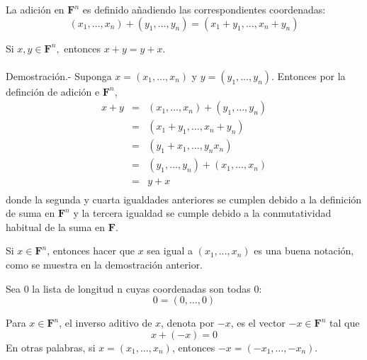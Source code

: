 \setcounter{mydef}{11}
    \begin{mydef}
	La adición en $\textbf{F}^n$ es definido añadiendo las correspondientes coordenadas: 
	$$(x_1,\ldots,x_n)+(y_1,\ldots, y_n)=(x_1+y_1,\ldots, x_n + y_n)$$
    \end{mydef}

\begin{myteo}
    Si $x,y \in \textbf{F}^n,$ entonces $x+y=y+x$.\\\\
    Demostración.-\; Suponga $x=(x_1,\ldots, x_n)$ y $y=(y_1,\ldots, y_n)$. Entonces por la definción de adición e $\textbf{F}^n$,
    $$\begin{array}{rcl}
	x+y&=&(x_1,\ldots,x_n)+(y_1,\ldots,y_n)\\
	   &=&(x_1+y_1,\ldots, x_n + y_n)\\
	   &=&(y_1+x_1,\ldots, y_n x_n)\\
	   &=&(y_1,\ldots,y_n)+(x_1,\ldots,x_n)\\
	   &=&y+x\\
    \end{array}$$
    donde la segunda y cuarta igualdades anteriores se cumplen debido a la definición de suma en $\textbf{F}^n$ y la tercera igualdad se cumple debido a la conmutatividad habitual de la suma en $\textbf{F}$.
\end{myteo}
\vspace{0.3cm}

    Si $x \in \textbf{F}^n$, entonces hacer que $x$ sea igual a $(x_1,\ldots,x_n)$ es una buena notación, como se muestra en la demostración anterior.

    \begin{mydef}[$0$]
	Sea $0$ la lista de longitud n cuyas coordenadas son todas 0: 
	$$0=(0,\ldots,0)$$
    \end{mydef}

\setcounter{mydef}{15}
    \begin{mydef}
	Para $x\in \textbf{F}^n$, el inverso aditivo de $x$, denota por $-x$, es el vector $-x\in \textbf{F}^n$ tal que $$x+(-x) =0$$
	En otras palabras, si $x=(x_1,\ldots,x_n)$, entonces $-x=(-x_1,\ldots,-x_n).$
    \end{mydef}

